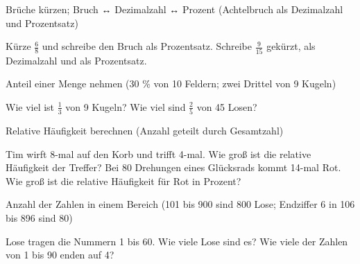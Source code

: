 \setcounter{aufgabe}{0}

\begin{aufgabe}{Brüche kürzen; Bruch ↔ Dezimalzahl ↔ Prozent (Achtelbruch als Dezimalzahl und Prozentsatz)}
\begin{teile}
\teil Kürze $\frac{6}{8}$ und schreibe den Bruch als Prozentsatz.
\teil Schreibe $\frac{9}{15}$ gekürzt, als Dezimalzahl und als Prozentsatz.
\end{teile}
\end{aufgabe}

\begin{aufgabe}{Anteil einer Menge nehmen (30 \% von 10 Feldern; zwei Drittel von 9 Kugeln)}
\begin{teile}
\teil Wie viel ist $\frac{1}{3}$ von 9 Kugeln?
\teil Wie viel sind $\frac{2}{5}$ von 45 Losen?
\end{teile}
\end{aufgabe}

\begin{aufgabe}{Relative Häufigkeit berechnen (Anzahl geteilt durch Gesamtzahl)}
\begin{teile}
\teil Tim wirft 8-mal auf den Korb und trifft 4-mal. Wie groß ist die relative Häufigkeit der Treffer?
\teil Bei 80 Drehungen eines Glücksrads kommt 14-mal Rot. Wie groß ist die relative Häufigkeit für Rot in Prozent?
\end{teile}
\end{aufgabe}

\begin{aufgabe}{Anzahl der Zahlen in einem Bereich (101 bis 900 sind 800 Lose; Endziffer 6 in 106 bis 896 sind 80)}
\begin{teile}
\teil Lose tragen die Nummern 1 bis 60. Wie viele Lose sind es?
\teil Wie viele der Zahlen von 1 bis 90 enden auf 4?
\end{teile}
\end{aufgabe}

